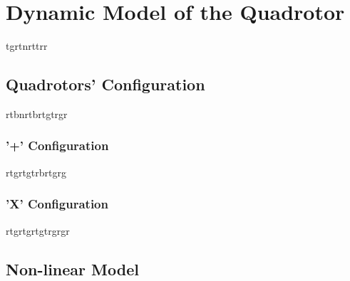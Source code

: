 \chapter{Dynamic Model of the Quadrotor \label{ch:model}}
tgrtnrttrr
\section{Quadrotors' Configuration}
rtbnrtbrtgtrgr
\subsection{'+' Configuration}
rtgrtgtrbrtgrg
\subsection{'X' Configuration}
rtgrtgrtgtrgrgr
\section{Non-linear Model}

